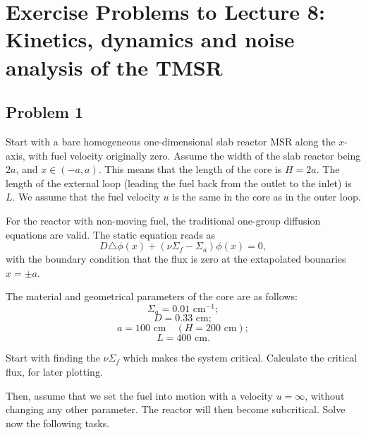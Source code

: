 \documentclass[openright, 12pt, a4paper, twoside, onecolumn]{book}
\newcommand*{\smallspace}{\vspace{0.5cm}}
\begin{document}
\chapter*{Exercise Problems to Lecture 8:\\
Kinetics, dynamics and noise analysis of the TMSR}

\section*{Problem 1}

\noindent
Start with a bare homogeneous one-dimensional slab reactor MSR along the $x$-axis, with fuel velocity originally zero. 
Assume the width of the slab reactor being $2a$, and $x \in (-a,a)$. This means that the length of the core is $H = 2a$. The length of the external loop (leading the fuel back from the outlet to the inlet) is $L$. We assume that the fuel velocity $u$ is the same in the core as in the outer loop. 
\smallspace

For the reactor with non-moving fuel, the traditional one-group diffusion equations are valid. The static equation reads as
\begin{equation}\label{eq:3}
D \triangle  \phi(x)+ (\nu \Sigma_f-\Sigma_a) \phi(x)=0,
\end{equation}
with the boundary condition that the flux is zero at the extapolated bounaries $x=\pm a$.

\smallspace

The material and geometrical parameters of the core are as follows:
\begin{displaymath}
\Sigma_a=0.01 \,\, \text{cm}^{-1};
\end{displaymath}
\begin{displaymath}
D=0.33 \,\, \text{cm};
\end{displaymath}
\begin{displaymath}
a=100 \,\, \text{cm} \quad (H=200 \, \, \text{cm});
\end{displaymath}
\begin{displaymath}
L=400 \,\, \text{cm}.
\end{displaymath}

Start with finding the $\nu \Sigma_f$  which makes the system critical. Calculate the critical flux, for later plotting.

\smallspace
Then, assume that we set the fuel into motion with a velocity $u = \infty$, without changing any other parameter. The reactor will then become subcritical.
\smallspace
Solve now the following tasks.
\end{document}
